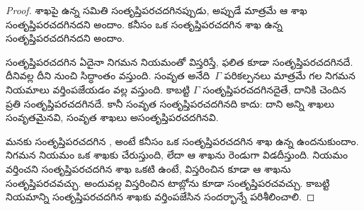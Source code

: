 \documentclass[../../../include/open-logic-section]{subfiles}
\begin{document}
\begin{proof}
 శాఖపై ఉన్న
సమితి సంతృప్తిపరచదగినప్పుడు, అప్పుడే మాత్రమే ఆ శాఖ
సంతృప్తిపరచదగినదని అందాం.
కనీసం ఒక సంతృప్తిపరచదగిన శాఖ ఉన్న
సంతృప్తిపరచదగినదని అందాం.

సంతృప్తిపరచదగిన
ఏదైనా నిగమన నియమంతో విస్తరిస్తే,
ఫలిత 
కూడా సంతృప్తిపరచదగినదే. దీనివల్ల
దీని నుంచి సిద్ధాంతం వస్తుంది. సంవృత
అనేది~$\Gamma$ పరికల్పనలు మాత్రమే గల
నిగమన నియమాలు వర్తింపజేయడం వల్ల
వస్తుంది. కాబట్టి $\Gamma$
సంతృప్తిపరచదగినదైతే, దానికి చెందిన
ప్రతి 
సంతృప్తిపరచదగినదే. కానీ సంవృత
సంతృప్తిపరచదగినది కాదు: దాని అన్ని
శాఖలు సంవృతమైనవి, సంవృత శాఖలు
అసంతృప్తిపరచదగినవి.

మనకు సంతృప్తిపరచదగిన
, అంటే
కనీసం ఒక సంతృప్తిపరచదగిన శాఖ ఉన్న
ఉందనుకుందాం. నిగమన నియమం ఒక
శాఖకు  చేరుస్తుంది,
లేదా ఆ శాఖను రెండుగా విడదీస్తుంది.
 నియమం వర్తించని
సంతృప్తిపరచదగిన శాఖ ఒకటి ఉంటే, విస్తరించిన
 కూడా ఆ శాఖను
సంతృప్తిపరచవచ్చు. అందువల్ల విస్తరించిన టాబ్లోను
కూడా సంతృప్తిపరచవచ్చు.
కాబట్టి నియమాన్ని
సంతృప్తిపరచదగిన శాఖకు
వర్తింపజేసిన సందర్భాన్నే పరిశీలించాలి.


\end{proof}
\end{document}
